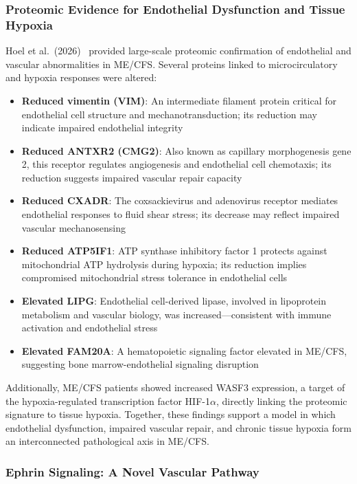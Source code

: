 \subsubsection{Proteomic Evidence for Endothelial Dysfunction and Tissue Hypoxia}

Hoel et al.\ (2026)~\cite{Hoel2026proteome} provided large-scale proteomic confirmation of endothelial and vascular abnormalities in ME/CFS. Several proteins linked to microcirculatory and hypoxia responses were altered:

\begin{itemize}
    \item \textbf{Reduced vimentin (VIM)}: An intermediate filament protein critical for endothelial cell structure and mechanotransduction; its reduction may indicate impaired endothelial integrity
    \item \textbf{Reduced ANTXR2 (CMG2)}: Also known as capillary morphogenesis gene 2, this receptor regulates angiogenesis and endothelial cell chemotaxis; its reduction suggests impaired vascular repair capacity
    \item \textbf{Reduced CXADR}: The coxsackievirus and adenovirus receptor mediates endothelial responses to fluid shear stress; its decrease may reflect impaired vascular mechanosensing
    \item \textbf{Reduced ATP5IF1}: ATP synthase inhibitory factor 1 protects against mitochondrial ATP hydrolysis during hypoxia; its reduction implies compromised mitochondrial stress tolerance in endothelial cells
    \item \textbf{Elevated LIPG}: Endothelial cell-derived lipase, involved in lipoprotein metabolism and vascular biology, was increased---consistent with immune activation and endothelial stress
    \item \textbf{Elevated FAM20A}: A hematopoietic signaling factor elevated in ME/CFS, suggesting bone marrow-endothelial signaling disruption
\end{itemize}

Additionally, ME/CFS patients showed increased WASF3 expression, a target of the hypoxia-regulated transcription factor HIF-1$\alpha$, directly linking the proteomic signature to tissue hypoxia. Together, these findings support a model in which endothelial dysfunction, impaired vascular repair, and chronic tissue hypoxia form an interconnected pathological axis in ME/CFS.

\subsubsection{Ephrin Signaling: A Novel Vascular Pathway}

